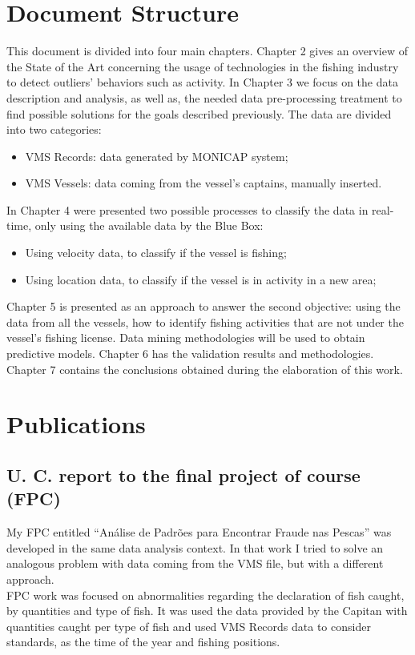 \section{Document Structure} %
\label{sec:work_structure}
This document is divided into four main chapters. Chapter 2 gives an overview of the State of the Art concerning the usage of technologies in the fishing industry to detect outliers’ behaviors such as activity. In Chapter 3 we focus on the data description and analysis, as well as, the needed data pre-processing treatment to find possible solutions for the goals described previously. The data are divided into two categories:
\begin{itemize}
\item VMS Records: data generated by MONICAP system;
\item VMS Vessels: data coming from the vessel’s captains, manually inserted.
\end{itemize}
In Chapter 4 were presented two possible processes to classify the data in real-time, only using the available data by the Blue Box:
\begin{itemize}
\item    Using velocity data, to classify if the vessel is fishing;
\item    Using location data, to classify if the vessel is in activity in a new area;
\end{itemize}
Chapter 5 is presented as an approach to answer the second objective: using the data from all the vessels, how to identify fishing activities that are not under the vessel’s fishing license. Data mining methodologies will be used to obtain predictive models.
Chapter 6 has the validation results and methodologies.
Chapter 7 contains the conclusions obtained during the elaboration of this work.


\section{Publications} %
\label{sec:publications}

\subsection{U. C. report to the final project of course (FPC)} %
\label{sub:fpc}
My FPC entitled “Análise de Padrões para Encontrar Fraude nas Pescas” was developed in the same data analysis context. In that work I tried to solve an analogous problem with data coming from the VMS file, but with a different approach.\\
FPC work was focused on abnormalities regarding the declaration of fish caught, by quantities and type of fish. It was used the data provided by the Capitan with quantities caught per type of fish and used VMS Records data to consider standards, as the time of the year and fishing positions.

